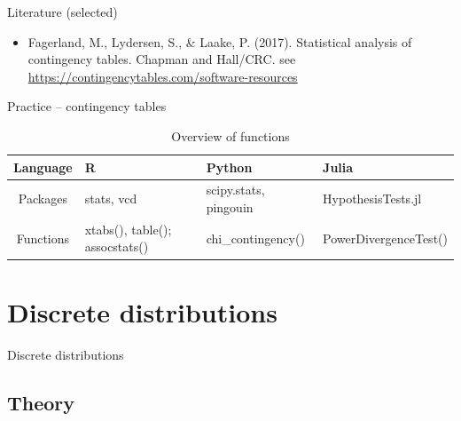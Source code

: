 \documentclass[10pt,ignorenonframetext,aspectratio=169]{beamer}
\begin{document}
\begin{frame}{Literature (selected)}
    \begin{itemize}
        \item Fagerland, M., Lydersen, S., \& Laake, P. (2017). Statistical analysis of contingency tables. Chapman and Hall/CRC. see \url{https://contingencytables.com/software-resources}
    \end{itemize}
\end{frame}
\begin{frame}{Practice -- contingency tables}
      \begin{table}[]
        \centering
        \caption{Overview of functions}
        \begin{tabular}{cp{3cm}p{3cm}p{3cm}}
        \hline
          \textbf{Language}   & \textbf{R} &  \textbf{Python} & \textbf{Julia} \\
        \hline
         Packages  & 
         stats, vcd & scipy.stats, pingouin &  Hypothesis\-Tests.jl \\
        Functions &
          xtabs(), table(); assocstats() & chi\_contingency()  & Power\-Divergence\-Test() \\
        \hline
        \end{tabular}
 
    \end{table}
\end{frame}

\section{Discrete distributions}

\begin{frame}{}
\begin{center}
    \Large{Discrete distributions}
\end{center}    
\end{frame}


\subsection{Theory}
\end{document}
